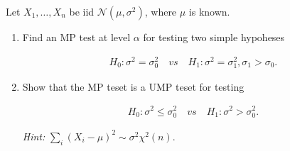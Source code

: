 
\begin{exercise}

Let $X_1, \dots, X_n$ be iid $\mathcal N(\mu, \sigma^2)$, where $\mu$ is known.

\begin{enumerate}[label = (\alph*)]

    \item Find an MP test at level $\alpha$ for testing two simple hypoheses
    
    \begin{align*}
        H_0: \sigma^2 = \sigma_0^2
        \quad
        \textit{vs}
        \quad
        H_1: \sigma^2 = \sigma_1^2, \sigma_1 > \sigma_0.
    \end{align*}

    \item Show that the MP teset is a UMP teset for testing
    
    \begin{align*}
        H_0: \sigma^2 \leq \sigma_0^2
        \quad
        \textit{vs}
        \quad
        H_1: \sigma^2 > \sigma_0^2.
    \end{align*}

    \textit{Hint:}
    $\sum_i (X_i - \mu)^2 \sim \sigma^2 \chi^2(n)$.

\end{enumerate}

\end{exercise}


